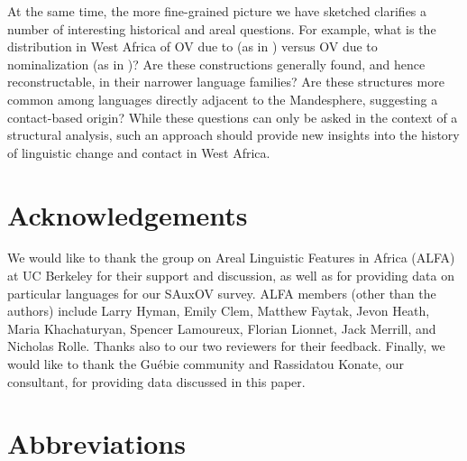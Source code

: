 \documentclass[output=paper]{LSP/langsci}
\begin{document}
At the same time, the more fine-grained picture we have sketched clarifies a number of interesting historical and areal questions. For example, what is the distribution in West Africa of OV due to  (as in ) versus OV due to nominalization (as in )? Are these constructions generally found, and hence reconstructable, in their narrower language families? Are these structures more common among languages directly adjacent to the Mandesphere, suggesting a contact-based origin? While these questions can only be asked in the context of a structural analysis, such an approach should provide new insights into the history of linguistic change and contact in West Africa.


\section*{Acknowledgements}
We would like to thank the group on Areal Linguistic Features in Africa (ALFA) at UC Berkeley for their support and discussion, as well as for providing data on particular languages for our SAuxOV survey. ALFA members (other than the authors) include Larry Hyman, Emily Clem, Matthew Faytak, Jevon Heath, Maria Khachaturyan, Spencer Lamoureux, Florian Lionnet, Jack Merrill, and Nicholas Rolle. Thanks also to our two reviewers for their feedback. Finally, we would like to thank the Gu\'ebie community and Rassidatou Konate, our  consultant, for providing data discussed in this paper.

\section*{Abbreviations}
\end{document}
